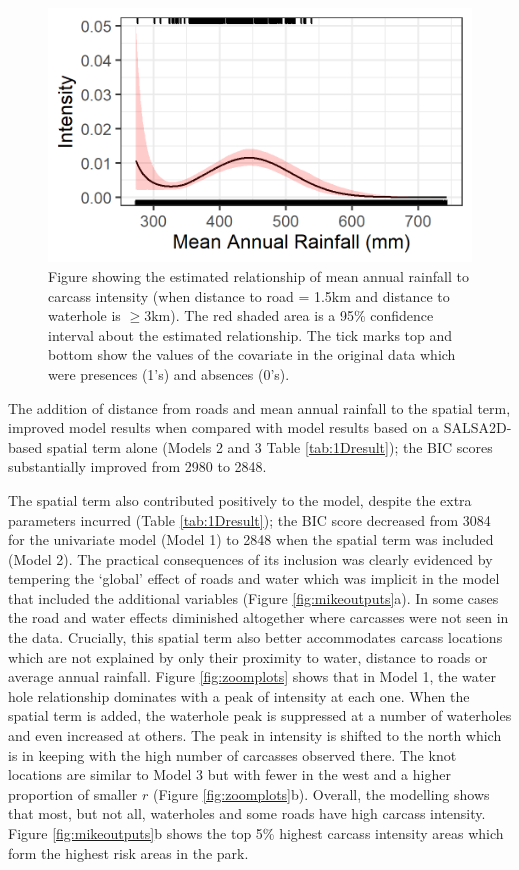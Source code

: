 \documentclass[letterpaper]{interact}
\begin{document}
\begin{figure}[!ht]
\centering
\includegraphics[width=0.7\linewidth]{images/mike_analysis1D_partials_rain.jpg}
\caption{Figure showing the estimated relationship of mean annual rainfall to carcass intensity (when distance to road = 1.5km and distance to waterhole is $\geq3$km).  The red shaded area is a 95\% confidence interval about the estimated relationship. The tick marks top and bottom show the values of the covariate in the original data which were presences (1's) and absences (0's).}
\label{fig:mikeresultpartialrain}
\end{figure}

The addition of distance from roads and mean annual rainfall to the spatial term, improved model results when compared with model results based on a SALSA2D-based spatial term alone (Models 2 and 3 Table \ref{tab:1Dresult}); the BIC scores substantially improved from 2980 to 2848.

The spatial term also contributed positively to the model, despite the extra parameters incurred (Table \ref{tab:1Dresult}); the BIC score decreased from 3084 for the univariate model (Model 1) to 2848 when the spatial term was included (Model 2). The practical consequences of its inclusion was clearly evidenced by tempering the `global' effect of roads and water which was implicit in the model that included the additional variables (Figure \ref{fig:mikeoutputs}a). In some cases the road and water effects diminished altogether where carcasses were not seen in the data. Crucially, this spatial term also better accommodates carcass locations which are not explained by only their proximity to water, distance to roads or average annual rainfall. Figure \ref{fig:zoomplots} shows that in Model 1, the water hole relationship dominates with a peak of intensity at each one. When the spatial term is added, the waterhole peak is suppressed at a number of waterholes and even increased at others. The peak in intensity is shifted to the north which is in keeping with the high number of carcasses observed there. The knot locations are similar to Model 3 but with fewer in the west and a higher proportion of smaller $r$ (Figure \ref{fig:zoomplots}b). Overall, the modelling shows that most, but not all, waterholes and some roads have high carcass intensity. Figure \ref{fig:mikeoutputs}b shows the top 5\% highest carcass intensity areas which form the highest risk areas in the park. 
\end{document}
